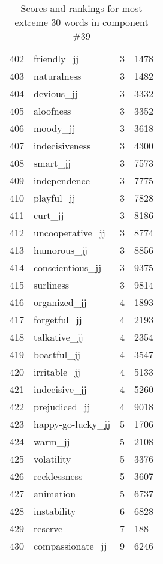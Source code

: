 \begin{longtable}[!htbp]{| rlr@{.}l |}
    402 & friendly\_jj & 3 & 1478 \\
    403 & naturalness & 3 & 1482 \\
    404 & devious\_jj & 3 & 3332 \\
    405 & aloofness & 3 & 3352 \\
    406 & moody\_jj & 3 & 3618 \\
    407 & indecisiveness & 3 & 4300 \\
    408 & smart\_jj & 3 & 7573 \\
    409 & independence & 3 & 7775 \\
    410 & playful\_jj & 3 & 7828 \\
    411 & curt\_jj & 3 & 8186 \\
    412 & uncooperative\_jj & 3 & 8774 \\
    413 & humorous\_jj & 3 & 8856 \\
    414 & conscientious\_jj & 3 & 9375 \\
    415 & surliness & 3 & 9814 \\
    416 & organized\_jj & 4 & 1893 \\
    417 & forgetful\_jj & 4 & 2193 \\
    418 & talkative\_jj & 4 & 2354 \\
    419 & boastful\_jj & 4 & 3547 \\
    420 & irritable\_jj & 4 & 5133 \\
    421 & indecisive\_jj & 4 & 5260 \\
    422 & prejudiced\_jj & 4 & 9018 \\
    423 & happy-go-lucky\_jj & 5 & 1706 \\
    424 & warm\_jj & 5 & 2108 \\
    425 & volatility & 5 & 3376 \\
    426 & recklessness & 5 & 3607 \\
    427 & animation & 5 & 6737 \\
    428 & instability & 6 & 6828 \\
    429 & reserve & 7 & 188 \\
    430 & compassionate\_jj & 9 & 6246 \\
    \hline
    \caption{Scores and rankings for most extreme 30 words in component \#39} \\
\end{longtable}
